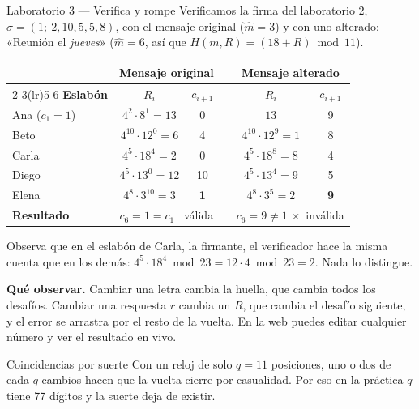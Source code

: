 \documentclass[11pt,a4paper]{article}
\theoremstyle{definition}
\theoremstyle{plain}
\theoremstyle{remark}
\newcommand{\mh}{\hat{m}}
\newcommand{\si}{\textcolor{mintc}{\checkmark}}
\newcommand{\no}{\textcolor{coralc}{$\times$}}
\begin{document}
\begin{laboratorio}{Laboratorio 3 — Verifica y rompe}
Verificamos la firma del laboratorio 2, $\sigma = (1;\ 2, 10, 5, 5, 8)$, con el
mensaje original ($\mh = 3$) y con uno alterado: «Reunión el \emph{jueves}»
($\mh = 6$, así que $H(m,R) = (18 + R) \bmod 11$).

\begin{center}\small
\begin{tabular}{@{}l c c c c c@{}}
\toprule
& \multicolumn{2}{c}{\textbf{Mensaje original}} & & \multicolumn{2}{c}{\textbf{Mensaje alterado}} \\
\cmidrule(lr){2-3}\cmidrule(lr){5-6}
\textbf{Eslabón} & $R_i$ & $c_{i+1}$ & & $R_i$ & $c_{i+1}$ \\
\midrule
Ana   ($c_1 = 1$)   & $4^{2}\cdot 8^{1} = 13$    & 0  & & $13$ & 9 \\
Beto  & $4^{10}\cdot 12^{0} = 6$  & 4  & & $4^{10}\cdot 12^{9} = 1$  & 8 \\
Carla & $4^{5}\cdot 18^{4} = 2$   & 0  & & $4^{5}\cdot 18^{8} = 8$   & 4 \\
Diego & $4^{5}\cdot 13^{0} = 12$  & 10 & & $4^{5}\cdot 13^{4} = 9$   & 5 \\
Elena & $4^{8}\cdot 3^{10} = 3$   & \textbf{1} & & $4^{8}\cdot 3^{5} = 2$ & \textbf{9} \\
\midrule
\textbf{Resultado} & \multicolumn{2}{c}{$c_6 = 1 = c_1$ \si\ válida} & & \multicolumn{2}{c}{$c_6 = 9 \neq 1$ \no\ inválida} \\
\bottomrule
\end{tabular}
\end{center}

Observa que en el eslabón de Carla, la firmante, el verificador hace la misma
cuenta que en los demás: $4^{5}\cdot 18^{4} \bmod 23 = 12\cdot 4 \bmod 23 = 2$.
Nada lo distingue.

\textbf{Qué observar.} Cambiar una letra cambia la huella, que cambia todos los
desafíos. Cambiar una respuesta $r$ cambia un $R$, que cambia el desafío siguiente,
y el error se arrastra por el resto de la vuelta. En la web puedes editar cualquier
número y ver el resultado en vivo.
\end{laboratorio}

\begin{aviso}{Coincidencias por suerte}
Con un reloj de solo $q = 11$ posiciones, uno o dos de cada $q$ cambios hacen que la
vuelta cierre por casualidad. Por eso en la práctica $q$ tiene 77 dígitos y la
suerte deja de existir.
\end{aviso}
\end{document}
